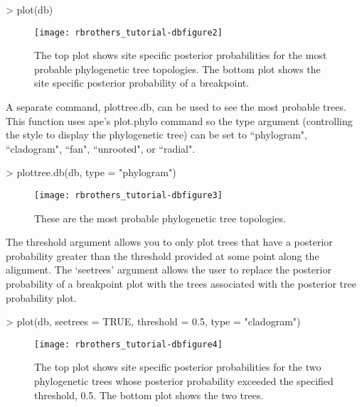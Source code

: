 \documentclass[12pt]{article}
\begin{document}
\begin{Schunk}
\begin{Sinput}
> plot(db)
\end{Sinput}
\end{Schunk}
\begin{figure}[!t]
  \centering
\texttt{[image: rbrothers\_tutorial-dbfigure2]}
\caption{The top plot shows site specific posterior probabilities for the most probable phylogenetic tree topologies. The bottom plot shows the site specific posterior probability of a breakpoint.}
\label{KALplot}
\end{figure}  

A separate command, plottree.db, can be used to see the most probable trees. This function uses ape's plot.phylo command so the type argument (controlling the style to display the phylogenetic tree) can be set to ``phylogram", ``cladogram", ``fan", ``unrooted", or ``radial". 

\begin{Schunk}
\begin{Sinput}
> plottree.db(db, type = "phylogram")
\end{Sinput}
\end{Schunk}
\begin{figure}[!t]
  \centering
\texttt{[image: rbrothers\_tutorial-dbfigure3]}
\caption{These are the most probable phylogenetic tree topologies.}
\label{KALplot2}
\end{figure}  

The threshold argument allows you to only plot trees that have a posterior probability greater than the threshold provided at some point along the alignment. The `seetrees' argument allows the user to replace the posterior probability of a breakpoint plot with the trees associated with the posterior tree probability plot.
\begin{Schunk}
\begin{Sinput}
> plot(db, seetrees = TRUE, threshold = 0.5, type = "cladogram")
\end{Sinput}
\end{Schunk}
\begin{figure}[!t]
  \centering
\texttt{[image: rbrothers\_tutorial-dbfigure4]}
\caption{The top plot shows site specific posterior probabilities for the two phylogenetic trees whose posterior probability exceeded the specified threshold, 0.5. The bottom plot shows the two trees.}
\label{KALplot3}
\end{figure} 
\end{document}
